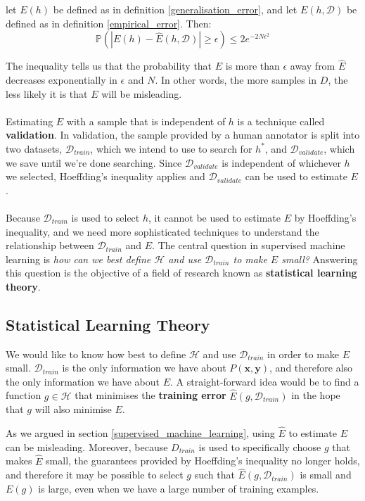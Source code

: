 \begin{theorem}
	let $E(h)$ be defined as in definition \ref{generalisation_error}, and let $E(h, \mathcal{D})$ be defined as in definition \ref{empirical_error}. Then:
	$$
	\mathbb{P}\left( |E(h) - \hat{E}(h, \mathcal{D})| \geq \epsilon \right) \leq 2e^{-2N\epsilon^2}
	$$
\end{theorem}

The inequality tells us that the probability that $E$ is more than $\epsilon$ away from $\hat{E}$ decreases exponentially in $\epsilon$ and $N$. In other words, the more samples in $D$, the less likely it is that $E$ will be misleading.
\\\\
Estimating $E$ with a sample that is independent of $h$ is a technique called \textbf{validation}. In validation, the sample provided by a human annotator is split into two datasets, $\mathcal{D}_{train}$, which we intend to use to search for $h^*$, and $\mathcal{D}_{validate}$, which we save until we're done searching. Since $\mathcal{D}_{validate}$ is independent of whichever $h$ we selected, Hoeffding's inequality applies and $\mathcal{D}_{validate}$ can be used to estimate $E$.
\\\\
Because $\mathcal{D}_{train}$ is used to select $h$, it cannot be used to estimate $E$ by Hoeffding's inequality, and we need more sophisticated techniques to understand the relationship between $\mathcal{D}_{train}$ and $E$. The central question in supervised machine learning is \textit{how can we best define $\mathcal{H}$ and use $\mathcal{D}_{train}$ to make $E$ small?} Answering this question is the objective of a field of research known as \textbf{statistical learning theory}.

\subsection{Statistical Learning Theory}
\label{statistical_learning_theory}
We would like to know how best to define $\mathcal{H}$ and use $\mathcal{D}_{train}$ in order to make $E$ small. $\mathcal{D}_{train}$ is the only information we have about $P(\mathbf{x}, \mathbf{y})$, and therefore also the only information we have about $E$. A straight-forward idea would be to find a function $g \in \mathcal{H}$ that minimises the \textbf{training error} $\hat{E}(g, \mathcal{D}_{train})$ in the hope that $g$ will also minimise $E$. 

As we argued in section \ref{supervised_machine_learning}, using $\hat{E}$ to estimate $E$ can be misleading. Moreover, because $D_{train}$ is used to specifically choose $g$ that makes $\hat{E}$ small, the guarantees provided by Hoeffding's inequality no longer holds, and therefore it may be possible to select $g$ such that $\hat{E}(g, \mathcal{D}_{train})$ is small and $E(g)$ is large, even when we have a large number of training examples.

